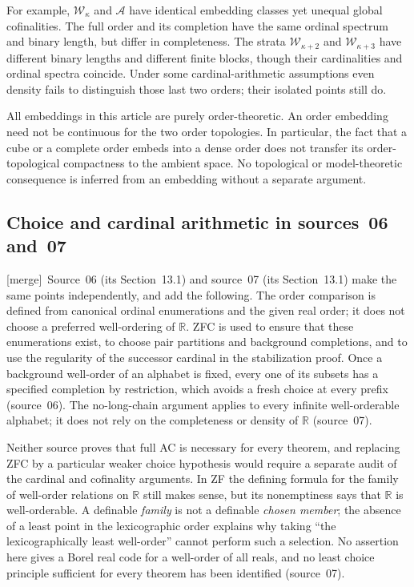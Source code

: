 \documentclass[11pt,a4paper]{article}
\theoremstyle{definition}
\theoremstyle{remark}
\newcommand{\R}{\mathbb R}
\newcommand{\W}{\mathcal W}
\newcommand{\A}{\mathcal A}
\newcommand{\merge}{\textsf{[merge]}}
\begin{document}
For example, $\W_\kappa$ and $\A$ have identical embedding classes yet
unequal global cofinalities. The full order and its completion have the
same ordinal spectrum and binary length, but differ in completeness.
The strata $\W_{\kappa+2}$ and $\W_{\kappa+3}$ have different binary
lengths and different finite blocks, though their cardinalities and ordinal
spectra coincide. Under some cardinal-arithmetic assumptions even density
fails to distinguish those last two orders; their isolated points still do.

All embeddings in this article are purely order-theoretic. An order
embedding need not be continuous for the two order topologies. In
particular, the fact that a cube or a complete order embeds into a dense
order does not transfer its order-topological compactness to the ambient
space. No topological or model-theoretic consequence is inferred from an
embedding without a separate argument.

\subsection{Choice and cardinal arithmetic in sources~06 and~07}\label{lwo:sec:choice}
\merge\ Source~06 (its Section~13.1) and source~07 (its Section~13.1) make the
same points independently, and add the following. The order comparison is
defined from canonical ordinal enumerations and the given real order; it does
not choose a preferred well-ordering of $\R$. ZFC is used to ensure that these
enumerations exist, to choose pair partitions and background completions,
and to use the regularity of the successor cardinal in the stabilization
proof. Once a background well-order of an alphabet is fixed, every one of its
subsets has a specified completion by restriction, which avoids a fresh choice
at every prefix (source~06). The no-long-chain argument applies to every
infinite well-orderable alphabet; it does not rely on the completeness or
density of $\R$ (source~07).

Neither source proves that full AC is necessary for every theorem, and
replacing ZFC by a particular weaker choice hypothesis would require a
separate audit of the cardinal and cofinality arguments. In ZF the defining
formula for the family of well-order relations on $\R$ still makes sense, but
its nonemptiness says that $\R$ is well-orderable. A definable \emph{family} is
not a definable \emph{chosen member}; the absence of a least point in the
lexicographic order explains why taking ``the lexicographically least
well-order'' cannot perform such a selection. No assertion here gives a Borel
real code for a well-order of all reals, and no least choice principle
sufficient for every theorem has been identified (source~07).
\end{document}
